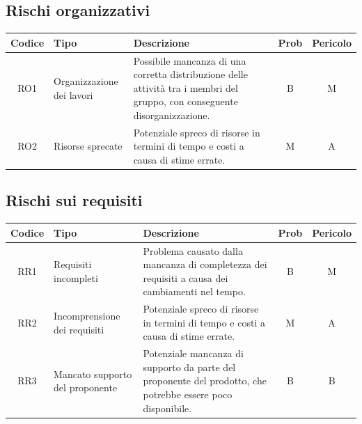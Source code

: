 \documentclass[9pt]{article}
\begin{document}
\subsection{Rischi organizzativi}
\begin{center}
	\small
	\begin{tabularx}{\textwidth}{|c|p{3cm}|X|c|c|}
		\hline
		\textbf{Codice} & \textbf{Tipo}             & \textbf{Descrizione}                                                                                                        & \textbf{Prob} & \textbf{Pericolo} \\
		\hline
		RO1             & Organizzazione dei lavori & Possibile mancanza di una corretta distribuzione delle attività tra i membri del gruppo, con conseguente disorganizzazione. & B             & M                 \\
		\hline
		RO2             & Risorse sprecate          & Potenziale spreco di risorse in termini di tempo e costi a causa di stime errate.                                           & M             & A                 \\
		\hline
	\end{tabularx}
\end{center}
\subsection{Rischi sui requisiti}
\begin{center}
	\small
	\begin{tabularx}{\textwidth}{|c|p{3cm}|X|c|c|}
		\hline
		\textbf{Codice} & \textbf{Tipo}                   & \textbf{Descrizione}                                                                                        & \textbf{Prob} & \textbf{Pericolo} \\
		\hline
		RR1             & Requisiti incompleti            & Problema causato dalla mancanza di completezza dei requisiti a causa dei cambiamenti nel tempo.             & B             & M                 \\
		\hline
		RR2             & Incomprensione dei requisiti    & Potenziale spreco di risorse in termini di tempo e costi a causa di stime errate.                           & M             & A                 \\
		\hline
		RR3             & Mancato supporto del proponente & Potenziale mancanza di supporto da parte del proponente del prodotto, che potrebbe essere poco disponibile. & B             & B                 \\
		\hline
	\end{tabularx}
\end{center}
\end{document}
